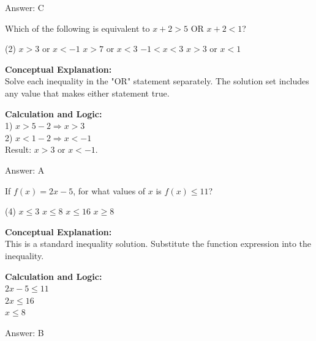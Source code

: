 \documentclass[11pt,paper=a4,answers]{exam}
\begin{document}
\begin{questions}
\begin{solution}
\vspace{15pt}
Answer: \colorbox{yellow!100}{C}
\end{solution}

\vspace{20pt}

\question
Which of the following is equivalent to $x + 2 > 5$ OR $x + 2 < 1$?
\begin{tasks}(2)
    \task $x > 3$ or $x < -1$
    \task $x > 7$ or $x < 3$
    \task $-1 < x < 3$
    \task $x > 3$ or $x < 1$
\end{tasks}

\begin{solution}
\textbf{Conceptual Explanation:} \\
Solve each inequality in the "OR" statement separately. The solution set includes any value that makes either statement true.

\vspace{10pt}
\textbf{Calculation and Logic:} \\
1) $x > 5 - 2 \Rightarrow x > 3$ \\
2) $x < 1 - 2 \Rightarrow x < -1$ \\
Result: $x > 3$ or $x < -1$.

\vspace{15pt}
Answer: \colorbox{yellow!100}{A}
\end{solution}

\vspace{20pt}

\question
If $f(x) = 2x - 5$, for what values of $x$ is $f(x) \le 11$?
\begin{tasks}(4)
    \task $x \le 3$
    \task $x \le 8$
    \task $x \le 16$
    \task $x \ge 8$
\end{tasks}

\begin{solution}
\textbf{Conceptual Explanation:} \\
This is a standard inequality solution. Substitute the function expression into the inequality.

\vspace{10pt}
\textbf{Calculation and Logic:} \\
$2x - 5 \le 11$ \\
$2x \le 16$ \\
$x \le 8$

\vspace{15pt}
Answer: \colorbox{yellow!100}{B}
\end{solution}


\end{questions}
\end{document}
